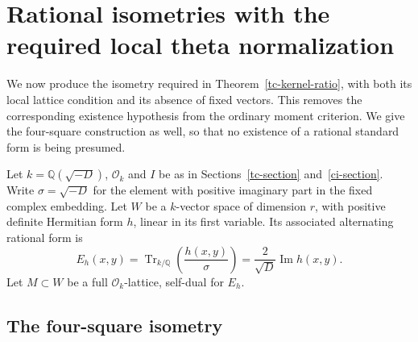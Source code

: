 \section{Rational isometries with the required local theta normalization}
\label{ts-section}

We now produce the isometry required in
Theorem~\ref{tc-kernel-ratio}, with both its local lattice
condition and its absence of fixed vectors.  This removes
the corresponding existence hypothesis from the ordinary
moment criterion.  We give the four-square construction as
well, so that no existence of a rational standard form is
being presumed.

Let $k=\mathbb Q(\sqrt{-D})$, $\mathcal O_k$ and $I$ be
as in Sections~\ref{tc-section} and~\ref{ci-section}.
Write $\sigma=\sqrt{-D}$ for the element with positive
imaginary part in the fixed complex embedding.
Let $W$ be a $k$-vector space of dimension $r$, with
positive definite Hermitian form $h$, linear in its first
variable.  Its associated alternating rational form is
\[
       E_h(x,y)=
           \operatorname{Tr}_{k/\mathbb Q}\!\left(\frac{h(x,y)}{\sigma}\right)
          =\frac2{\sqrt D}\operatorname{Im}h(x,y).
 \tag{TS1}
\]
Let $M\subset W$ be a full $\mathcal O_k$-lattice,
self-dual for $E_h$.

\subsection{The four-square isometry}

